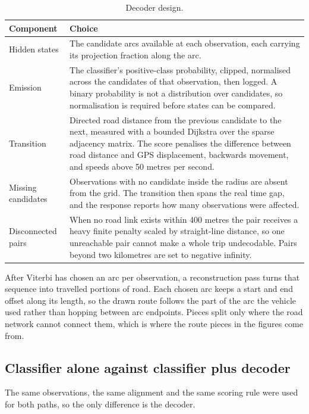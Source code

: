 \documentclass[11pt,a4paper]{article}
\begin{document}
\begin{table}[H]
\centering
\caption{Decoder design.}
\label{tab:hmm}
\small
\begin{tabular}{@{}p{}p{}@{}}
\toprule
\textbf{Component} & \textbf{Choice} \\
\midrule
Hidden states & The candidate arcs available at each observation, each carrying its projection
fraction along the arc. \\
\midrule
Emission & The classifier's positive-class probability, clipped, normalised across the candidates of
that observation, then logged. A binary probability is not a distribution over candidates, so
normalisation is required before states can be compared. \\
\midrule
Transition & Directed road distance from the previous candidate to the next, measured with a bounded
Dijkstra over the sparse adjacency matrix. The score penalises the difference between road distance
and GPS displacement, backwards movement, and speeds above 50 metres per second. \\
\midrule
Missing candidates & Observations with no candidate inside the radius are absent from the grid. The
transition then spans the real time gap, and the response reports how many observations were
affected. \\
\midrule
Disconnected pairs & When no road link exists within 400 metres the pair receives a heavy finite
penalty scaled by straight-line distance, so one unreachable pair cannot make a whole trip
undecodable. Pairs beyond two kilometres are set to negative infinity. \\
\bottomrule
\end{tabular}
\end{table}

After Viterbi has chosen an arc per observation, a reconstruction pass turns that sequence into
travelled portions of road. Each chosen arc keeps a start and end offset along its length, so the
drawn route follows the part of the arc the vehicle used rather than hopping between arc endpoints.
Pieces split only where the road network cannot connect them, which is where the route pieces in the
figures come from.

\subsection{Classifier alone against classifier plus decoder}

The same observations, the same alignment and the same scoring rule were used for both paths, so the
only difference is the decoder.
\end{document}
